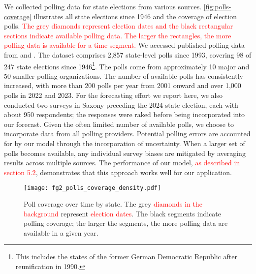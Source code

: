 \documentclass[12pt]{article}
\begin{document}
\begin{doublespacing}
We collected polling data for state elections from various sources. \autoref{fig:polls-coverage} illustrates all state elections since 1946 and the coverage of election polls. \textcolor{red}{The grey diamonds represent election dates and the black rectangular sections indicate available polling data. The larger the rectangles, the more polling data is available for a time segment.}
We accessed published polling data from \citet{dawum_state_polls} and \citet{wahlrecht_state_polls}. The dataset comprises 2,857 state-level polls since 1993, covering 98 of 247 state elections since 1946\footnote{This includes the states of the former German Democratic Republic after reunification in 1990.}. The polls come from approximately 10 major and 50 smaller polling organizations. The number of available polls has consistently increased, with more than 200 polls per year from 2001 onward and over 1,000 polls in 2022 and 2023. For the forecasting effort we report here, we also conducted two surveys in Saxony preceding the 2024 state election, each with about 950 respondents; the responses were raked before being incorporated into our forecast. Given the often limited number of available polls, we choose to incorporate data from all polling providers. Potential polling errors are accounted for by our model through the incorporation of uncertainty. 
When a larger set of polls becomes available, any individual survey biases are mitigated by averaging results across multiple sources. The  performance of our model, \textcolor{red}{as described in section 5.2}, demonstrates that this approach works well for our application.






\begin{figure}[t]
    \centering
    \texttt{[image: fg2\_polls\_coverage\_density.pdf]}  
    \caption{Poll coverage over time by state. The grey \textcolor{red}{diamonds in the background} represent \textcolor{red}{election dates}. The black segments indicate polling coverage; the larger the segments, the more polling data are available in a given year.}
    \label{fig:polls-coverage}
\end{figure}



\end{doublespacing}
\end{document}
